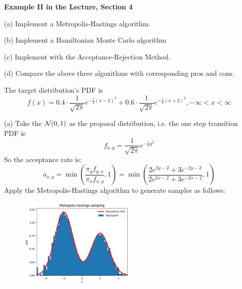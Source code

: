 \begin{homeworkProblem}

\textbf{Example II in the Lecture, Section 4}

(a) Implement a Metropolis-Hastings algorithm.

(b) Implement a Hamiltonian Monte Carlo algorithm

(c) Implement with the Acceptance-Rejection Method.

(d) Compare the above three algoxithms with corresponding pros and cons.

\solution

The target distribution's PDF is
$$f(x) = 0.4\cdot \dfrac{1}{\sqrt{2\pi}}e^{-\frac{1}{2}(x-2)^2} + 0.6\cdot \dfrac{1}{\sqrt{2\pi}}e^{-\frac{1}{2}(x+2)^2}, -\infty<x<\infty$$

(a) Take the $\mathcal{N}(0,1)$ as the proposal distribution, i.e. the one step transition PDF is
$$f_{x,y} = \dfrac{1}{\sqrt{2\pi}}e^{-\frac{1}{2}y^2}$$
So the acceptance rate is:
$$a_{x,y}=\min\left(\dfrac{\pi_yf_{y,x}}{\pi_xf_{x,y}},1\right)=\min\left(\dfrac{2e^{2y-2}+3e^{-2y-2}}{2e^{2x-2}+3e^{-2x-2}},1\right)$$
Apply the Metropolis-Hastings algorithm to generate samples as follows:
\begin{figure}[h]
    \centering
    \includegraphics[width=0.5\textwidth]{./figure/p11/MH.png}
\end{figure}



\end{homeworkProblem}
